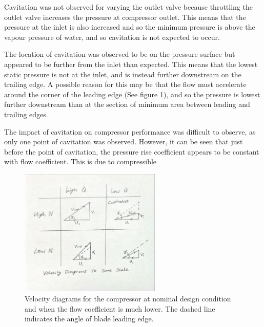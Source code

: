 \documentclass{article}
\begin{document}
Cavitation was not observed for varying the outlet valve because throttling the outlet valve increases the pressure at compressor outlet.
This means that the pressure at the inlet is also increased and so the minimum pressure is above the vapour pressure of water,
and so cavitation is not expected to occur.

The location of cavitation was observed to be on the pressure surface but appeared to be further from the inlet than expected.
This means that the lowest static pressure is not at the inlet, and is instead further downstream on the trailing edge.
A possible reason for this may be that the flow must accelerate around the corner of the leading edge (See figure \ref{fig:flow_scenario_velocity_diagrams}), and so the pressure is
lowest further downstream than at the section of minimum area between leading and trailing edges.

The impact of cavitation on compressor performance was difficult to observe, as only one point of cavitation was observed.
However, it can be seen that just before the point of cavitation, the pressure rise coefficient appears to be constant with flow coefficient.
This is due to compressible 


\begin{figure}[H]
    \centering
    \includegraphics[width=0.6\textwidth]{flow_scenario_velocity_diagrams.jpg}
    \caption{Velocity diagrams for the compressor at nominal design condition and when the flow coefficient is much lower. The dashed line indicates the angle of blade leading edge.}
    \label{fig:flow_scenario_velocity_diagrams}
\end{figure}
\end{document}
